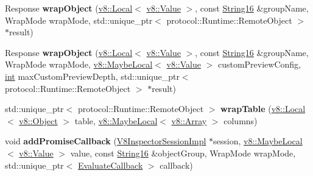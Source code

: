 \begin{DoxyCompactItemize}
\item 
\mbox{\label{classv8__inspector_1_1InjectedScript_ad4ff7897fa956b61c11786c90d42d4d6}} 
Response {\bfseries wrap\+Object} (\mbox{\hyperlink{classv8_1_1Local}{v8\+::\+Local}}$<$ \mbox{\hyperlink{classv8_1_1Value}{v8\+::\+Value}} $>$, const \mbox{\hyperlink{classv8__inspector_1_1String16}{String16}} \&group\+Name, Wrap\+Mode wrap\+Mode, std\+::unique\+\_\+ptr$<$ protocol\+::\+Runtime\+::\+Remote\+Object $>$ $\ast$result)
\item 
\mbox{\label{classv8__inspector_1_1InjectedScript_a76606b7c053f4efdedac75d3061483c7}} 
Response {\bfseries wrap\+Object} (\mbox{\hyperlink{classv8_1_1Local}{v8\+::\+Local}}$<$ \mbox{\hyperlink{classv8_1_1Value}{v8\+::\+Value}} $>$, const \mbox{\hyperlink{classv8__inspector_1_1String16}{String16}} \&group\+Name, Wrap\+Mode wrap\+Mode, \mbox{\hyperlink{classv8_1_1MaybeLocal}{v8\+::\+Maybe\+Local}}$<$ \mbox{\hyperlink{classv8_1_1Value}{v8\+::\+Value}} $>$ custom\+Preview\+Config, \mbox{\hyperlink{classint}{int}} max\+Custom\+Preview\+Depth, std\+::unique\+\_\+ptr$<$ protocol\+::\+Runtime\+::\+Remote\+Object $>$ $\ast$result)
\item 
\mbox{\label{classv8__inspector_1_1InjectedScript_adae6f6cb2717efec34b187cacc0fda20}} 
std\+::unique\+\_\+ptr$<$ protocol\+::\+Runtime\+::\+Remote\+Object $>$ {\bfseries wrap\+Table} (\mbox{\hyperlink{classv8_1_1Local}{v8\+::\+Local}}$<$ \mbox{\hyperlink{classv8_1_1Object}{v8\+::\+Object}} $>$ table, \mbox{\hyperlink{classv8_1_1MaybeLocal}{v8\+::\+Maybe\+Local}}$<$ \mbox{\hyperlink{classv8_1_1Array}{v8\+::\+Array}} $>$ columns)
\item 
\mbox{\label{classv8__inspector_1_1InjectedScript_a1979b1a9b5800a4bf7ceb93fe4d5eb4b}} 
void {\bfseries add\+Promise\+Callback} (\mbox{\hyperlink{classv8__inspector_1_1V8InspectorSessionImpl}{V8\+Inspector\+Session\+Impl}} $\ast$session, \mbox{\hyperlink{classv8_1_1MaybeLocal}{v8\+::\+Maybe\+Local}}$<$ \mbox{\hyperlink{classv8_1_1Value}{v8\+::\+Value}} $>$ value, const \mbox{\hyperlink{classv8__inspector_1_1String16}{String16}} \&object\+Group, Wrap\+Mode wrap\+Mode, std\+::unique\+\_\+ptr$<$ \mbox{\hyperlink{classv8__inspector_1_1EvaluateCallback}{Evaluate\+Callback}} $>$ callback)
\item 

\end{DoxyCompactItemize}
